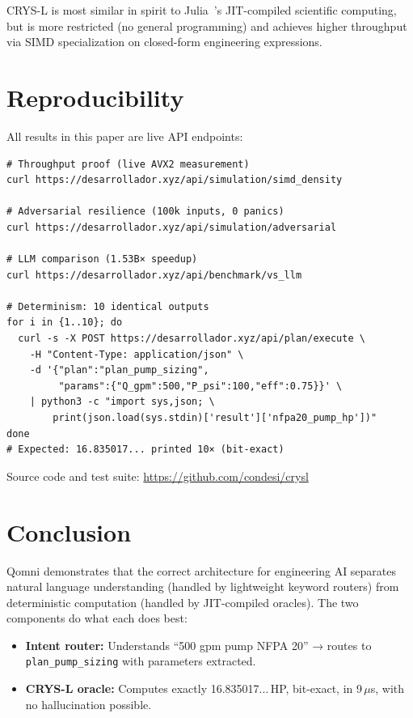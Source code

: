 \documentclass[11pt]{article}
\begin{document}
CRYS-L is most similar in spirit to Julia~\cite{bezanson2017julia}'s JIT-compiled
scientific computing, but is more restricted (no general programming) and achieves
higher throughput via SIMD specialization on closed-form engineering expressions.

\section{Reproducibility}

All results in this paper are live API endpoints:

\begin{lstlisting}[caption={Reproduce benchmark results}]
# Throughput proof (live AVX2 measurement)
curl https://desarrollador.xyz/api/simulation/simd_density

# Adversarial resilience (100k inputs, 0 panics)
curl https://desarrollador.xyz/api/simulation/adversarial

# LLM comparison (1.53B× speedup)
curl https://desarrollador.xyz/api/benchmark/vs_llm

# Determinism: 10 identical outputs
for i in {1..10}; do
  curl -s -X POST https://desarrollador.xyz/api/plan/execute \
    -H "Content-Type: application/json" \
    -d '{"plan":"plan_pump_sizing",
         "params":{"Q_gpm":500,"P_psi":100,"eff":0.75}}' \
    | python3 -c "import sys,json; \
        print(json.load(sys.stdin)['result']['nfpa20_pump_hp'])"
done
# Expected: 16.835017... printed 10× (bit-exact)
\end{lstlisting}

Source code and test suite: \url{https://github.com/condesi/crysl}

\section{Conclusion}

Qomni demonstrates that the correct architecture for engineering AI separates
natural language understanding (handled by lightweight keyword routers) from
deterministic computation (handled by JIT-compiled oracles). The two components
do what each does best:

\begin{itemize}
\item \textbf{Intent router:} Understands ``500 gpm pump NFPA 20'' → routes to
      \texttt{plan\_pump\_sizing} with parameters extracted.
\item \textbf{CRYS-L oracle:} Computes exactly 16.835017...\,HP, bit-exact,
      in 9\,$\mu$s, with no hallucination possible.
\end{itemize}
\end{document}
